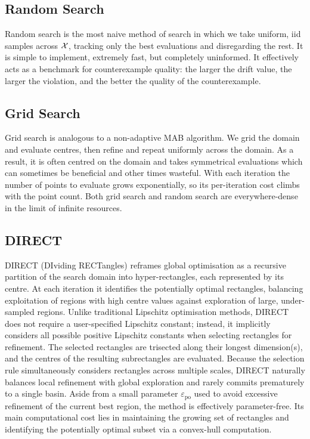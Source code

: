 \subsection{Random Search}

Random search is the most naive method of search in which we take uniform, iid samples across $\mathcal{X}$, tracking only the best evaluations and disregarding the rest. It is simple to implement, extremely fast, but completely uninformed. It effectively acts as a benchmark for counterexample quality: the larger the drift value, the larger the violation, and the better the quality of the counterexample.

\subsection{Grid Search}

Grid search is analogous to a non-adaptive MAB algorithm. We grid the domain and evaluate centres, then refine and repeat uniformly across the domain. As a result, it is often centred on the domain and takes symmetrical evaluations which can sometimes be beneficial and other times wasteful. With each iteration the number of points to evaluate grows exponentially, so its per-iteration cost climbs with the point count. Both grid search and random search are everywhere-dense in the limit of infinite resources.


\subsection{DIRECT}

DIRECT (DIviding RECTangles) \cite{Jones1993DIRECT} reframes global optimisation as a recursive partition of the search domain into hyper-rectangles, each represented by its centre. At each iteration it identifies the potentially optimal rectangles, balancing exploitation of regions with high centre values against exploration of large, under-sampled regions. Unlike traditional Lipschitz optimisation methods, DIRECT does not require a user-specified Lipschitz constant; instead, it implicitly considers all possible positive Lipschitz constants when selecting rectangles for refinement. The selected rectangles are trisected along their longest dimension(s), and the centres of the resulting subrectangles are evaluated. Because the selection rule simultaneously considers rectangles across multiple scales, DIRECT naturally balances local refinement with global exploration and rarely commits prematurely to a single basin. Aside from a small parameter $\varepsilon_{\mathrm{po}}$ used to avoid excessive refinement of the current best region, the method is effectively parameter-free. Its main computational cost lies in maintaining the growing set of rectangles and identifying the potentially optimal subset via a convex-hull computation.

